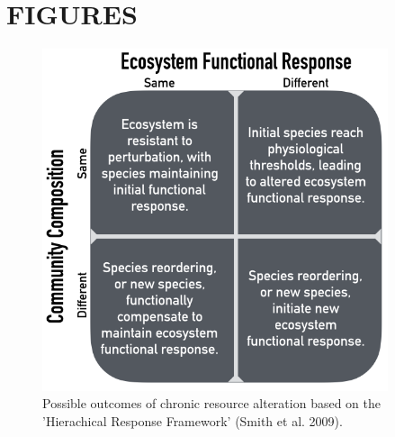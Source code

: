 \documentclass[fleqn,10pt,lineno]{wlpeerj} %
\begin{document}
\newpage{}

\section{FIGURES}\label{figures}

\begin{figure}[!ht]
  \centering
      \includegraphics[width=4in]{../figures/hypothesis_figtable.png}
  \caption{Possible outcomes of chronic resource alteration based on the 'Hierachical Response Framework' (Smith et al. 2009).}
\end{figure}

\newpage{}
\end{document}
